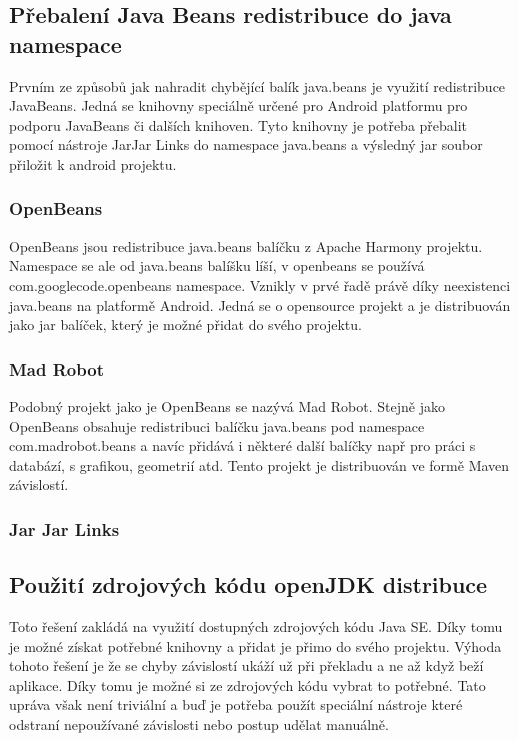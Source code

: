 \subsection{Přebalení Java Beans redistribuce do java namespace}
Prvním ze způsobů jak nahradit chybějící balík java.beans je využití redistribuce JavaBeans. Jedná se knihovny speciálně určené pro Android platformu pro podporu JavaBeans či dalších knihoven. Tyto knihovny je potřeba přebalit pomocí nástroje JarJar Links do namespace java.beans a výsledný jar soubor přiložit k android projektu. 

\subsubsection{OpenBeans}
OpenBeans jsou redistribuce java.beans balíčku z Apache Harmony projektu. Namespace se ale od java.beans balíšku líší, v openbeans se používá com.googlecode.openbeans namespace. Vznikly v prvé řadě právě díky neexistenci java.beans na platformě Android. Jedná se o opensource projekt a je distribuován jako jar balíček, který je možné přidat do svého projektu. 

\subsubsection{Mad Robot}
Podobný projekt jako je OpenBeans se nazývá Mad Robot. Stejně jako OpenBeans obsahuje redistribuci balíčku java.beans pod namespace com.madrobot.beans a navíc přidává i některé další balíčky např pro práci s databází, s grafikou, geometrií atd. Tento projekt je distribuován ve formě Maven závislostí.

\subsubsection{Jar Jar Links}

\subsection{Použití zdrojových kódu openJDK distribuce}
Toto řešení zakládá na využití dostupných zdrojových kódu Java SE. Díky tomu je možné získat potřebné knihovny a přidat je přimo do svého projektu. Výhoda tohoto řešení je že se chyby závislostí ukáží už při překladu a ne až když beží aplikace. Díky tomu je možné si ze zdrojových kódu vybrat to potřebné. Tato upráva však není triviální a buď je potřeba použít speciální nástroje které odstraní nepoužívané závislosti nebo postup udělat manuálně. 

